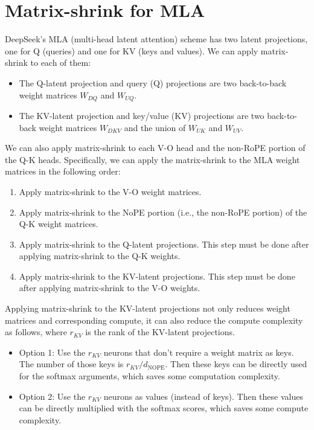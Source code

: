 \documentclass{article}
\begin{document}
\section{Matrix-shrink for MLA}
DeepSeek’s MLA (multi-head latent attention) scheme \cite{deepseek2024} has two latent projections, one for Q (queries) and one for KV (keys and values). We can apply matrix-shrink to each of them:

\begin{itemize}
\item The Q-latent projection and query (Q) projections are two back-to-back weight matrices $W_{DQ}$ and $W_{UQ}$.
\item The KV-latent projection and key/value (KV) projections are two back-to-back weight matrices $W_{DKV}$ and the union of $W_{UK}$ and $W_{UV}$.
\end{itemize}

We can also apply matrix-shrink to each V-O head and the non-RoPE portion of the Q-K heads. Specifically, we can apply the matrix-shrink to the MLA weight matrices in the following order:

\begin{enumerate}
\item Apply matrix-shrink to the V-O weight matrices.
\item Apply matrix-shrink to the NoPE portion (i.e., the non-RoPE portion) of the Q-K weight matrices.
\item Apply matrix-shrink to the Q-latent projections. This step must be done after applying matrix-shrink to the Q-K weights.
\item Apply matrix-shrink to the KV-latent projections. This step must be done after applying matrix-shrink to the V-O weights.
\end{enumerate}

Applying matrix-shrink to the KV-latent projections not only reduces weight matrices and corresponding compute, it can also reduce the compute complexity as follows, where $r_{KV}$ is the rank of the KV-latent projections.

\begin{itemize}
\item Option 1: Use the $r_{KV}$ neurons that don’t require a weight matrix as keys. The number of those keys is $r_{KV}/d_{\text{NOPE}}$. Then these keys can be directly used for the softmax arguments, which saves some computation complexity.
\item Option 2: Use the $r_{KV}$ neurons as values (instead of keys). Then these values can be directly multiplied with the softmax scores, which saves some compute complexity.
\end{itemize}
\end{document}
